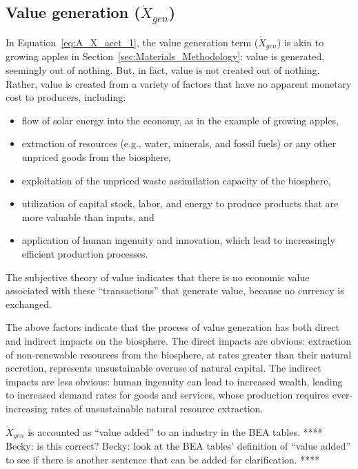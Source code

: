 \subsection{Value generation ($\dot{X}_{gen}$)}

\noindent In Equation~\ref{eq:A_X_acct_1}, 
the value generation term ($\dot{X}_{gen}$) is akin to growing apples
in Section~\ref{sec:Materials_Methodology}: 
value is generated, seemingly out of nothing.
But, in fact, value is not created out of nothing. 
Rather, value is created from a variety of factors that have no apparent 
monetary cost to producers, including:

\begin{itemize}
	\item{flow of solar energy
	into the economy,
	as in the example of growing apples,}
	\item{extraction of resources (e.g., water, minerals, and
	fossil fuels) or any other unpriced goods from the biosphere,}
	\item{exploitation of the unpriced waste assimilation capacity of the biosphere,}
	\item{utilization of capital stock, labor, and energy to produce products
	that are more valuable than inputs, and}
	\item{application of human ingenuity 
	and innovation, 
	which lead to increasingly efficient production processes.}
\end{itemize}

\noindent{}The subjective theory of value indicates that 
there is no economic value associated with these ``transactions''
that generate value, because no currency is exchanged. 

The above factors indicate that the process of value generation
has both direct and indirect impacts on the biosphere.
The direct impacts are obvious: 
extraction of non-renewable resources from the biosphere, 
at rates greater than their natural accretion,
represents unsustainable overuse of natural capital.
The indirect impacts are less obvious: 
human ingenuity can lead to increased wealth,
leading to increased demand rates for goods and services, 
whose production requires ever-increasing rates 
of unsustainable natural resource extraction.

$\dot{X}_{gen}$ is accounted as ``value added'' to an industry in the BEA tables.
**** Becky: is this correct? 
Becky: look at the BEA tables' definition of ``value added'' to 
see if there is another sentence that can be added for clarification. ****


